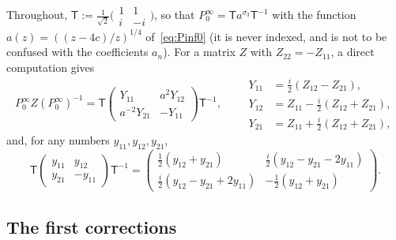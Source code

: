 Throughout, $\mathsf T:=\frac1{\sqrt2}\bigl(\begin{smallmatrix}1&1\\i&-i\end{smallmatrix}\bigr)$, so that
$P^\infty_0=\mathsf Ta^{\sigma_3}\mathsf T^{-1}$ with the function $a(z)=((z-4c)/z)^{1/4}$ of~\eqref{eq:Pinf0} (it is never
indexed, and is not to be confused with the coefficients $a_n$). For a matrix $Z$ with $Z_{22}=-Z_{11}$, a direct
computation gives
\begin{equation}\label{eq:conj-T}
  P^\infty_0Z(P^\infty_0)^{-1}=\mathsf T\begin{pmatrix}Y_{11}&a^2Y_{12}\\a^{-2}Y_{21}&-Y_{11}\end{pmatrix}\mathsf T^{-1},\qquad
  \begin{aligned}Y_{11}&=\tfrac i2(Z_{12}-Z_{21}),\\ Y_{12}&=Z_{11}-\tfrac i2(Z_{12}+Z_{21}),\\ Y_{21}&=Z_{11}+\tfrac i2(Z_{12}+Z_{21}),\end{aligned}
\end{equation}
and, for any numbers $y_{11},y_{12},y_{21}$,
\begin{equation}\label{eq:T-back}
  \mathsf T\begin{pmatrix}y_{11}&y_{12}\\y_{21}&-y_{11}\end{pmatrix}\mathsf T^{-1}=
  \begin{pmatrix}\frac12(y_{12}+y_{21})&\frac i2(y_{12}-y_{21}-2y_{11})\\[1mm]\frac i2(y_{12}-y_{21}+2y_{11})&-\frac12(y_{12}+y_{21})\end{pmatrix}.
\end{equation}

\subsection{The first corrections}\label{sec:second-corrections}

